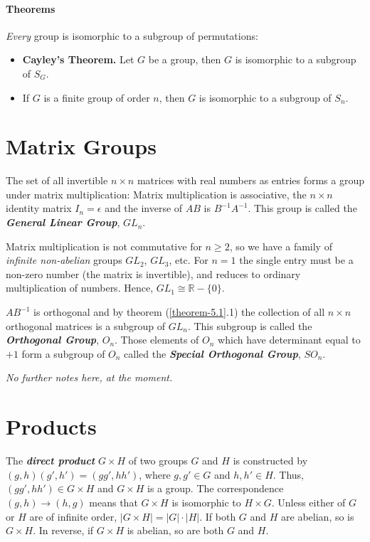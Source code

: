 \documentclass[a4paper,twocolumn,10pt]{article}
\begin{document}
  \paragraph{Theorems}
  \textit{Every} group is isomorphic to a subgroup of permutations:
  \begin{itemize}[leftmargin=0.45in]
    \item[\theorem{8.1}] \textbf{Cayley's Theorem.} Let $G$ be a group, then
      $G$ is isomorphic to a subgroup of $S_G$.

    \item[\theorem{8.2}] If $G$ is a finite group of order $n$, then $G$ is
      isomorphic to a subgroup of $S_n$.
  \end{itemize}

  \section{Matrix Groups}
  The set of all invertible $n \times n$ matrices with real numbers as entries
  forms a group under matrix multiplication: Matrix multiplication is
  associative, the $n \times n$ identity matrix $I_n=\epsilon$ and the inverse
  of $AB$ is $B^{-1}A^{-1}$. This group is called the \textbf{\textit{General
  Linear Group}}, $GL_n$.

  Matrix multiplication is not commutative for $n \geqslant 2$, so we have a
  family of \textit{infinite non-abelian} groups $GL_2$, $GL_3$, etc. For $n=1$
  the single entry must be a non-zero number (the matrix is invertible), and
  reduces to ordinary multiplication of numbers. Hence, $GL_1 \cong
  \mathbb{R}-\{0\}$.

  $AB^{-1}$ is orthogonal and by theorem (\ref{theorem-5.1}.1) the collection
  of all $n \times n$ orthogonal matrices is a subgroup of $GL_n$. This
  subgroup is called the \textbf{\textit{Orthogonal Group}}, $O_n$. Those
  elements of $O_n$ which have determinant equal to $+1$ form a subgroup of
  $O_n$ called the \textbf{\textit{Special Orthogonal Group}}, $SO_n$.

  \textit{No further notes here, at the moment.}

  \section{Products}
  The \textbf{\textit{direct product}} $G \times H$ of two groups $G$ and $H$
  is constructed by $(g,h)(g',h') = (gg',hh')$, where $g, g' \in G$ and $h, h'
  \in H$. Thus, $(gg',hh') \in G \times H$ and $G \times H$ is a group. The
  correspondence $(g,h) \rightarrow (h,g)$ means that $G \times H$ is
  isomorphic to $H \times G$. Unless either of $G$ or $H$ are of infinite
  order, $|G \times H| = |G|\cdot|H|$. If both $G$ and $H$ are abelian, so is
  $G \times H$. In reverse, if $G \times H$ is abelian, so are both $G$ and
  $H$.
\end{document}
